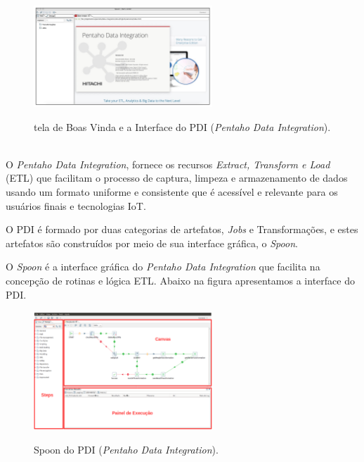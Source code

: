 \begin{figure}[H]
	\vspace*{0,2cm}
    \centering
    \caption{tela de Boas Vinda e a Interface do PDI (\textit{Pentaho Data Integration}).}
    \includegraphics[width=0.6\textwidth]{./04-figuras/figura-pentaho-pdi}
    \label{fig:ilustfigpentaho-pdi}
\end{figure}
\vspace*{-0,9cm}
{\raggedright {}} \\

O \textit{Pentaho Data Integration}, fornece os recursos \textit{Extract, Transform e Load} (ETL) que facilitam o processo de captura, limpeza e armazenamento de dados usando um formato uniforme e consistente que \'{e} acess\'{i}vel e relevante para os usu\'{a}rios finais e tecnologias IoT.

O PDI \'{e} formado por duas categorias de artefatos, \textit{Jobs} e Transforma\c{c}\~{o}es, e estes artefatos s\~{a}o constru\'{i}dos por meio de sua interface gr\'{a}fica, o \textit{Spoon}. 

O \textit{Spoon} \'{e} a interface gr\'{a}fica do \textit{Pentaho Data Integration} que facilita na concep\c{c}\~{a}o de rotinas e l\'ogica ETL. Abaixo na figura apresentamos a interface do PDI.

\begin{figure}[H]
	\vspace*{0,2cm}
    \centering
    \caption{Spoon do PDI (\textit{Pentaho Data Integration}).}
    \includegraphics[width=0.6\textwidth]{./04-figuras/figura-pentaho-pdi-spoon}
    \label{fig:ilustfigpentaho-pdi-spoon}
\end{figure}
\vspace*{-0,9cm}
{\raggedright {}} \\

